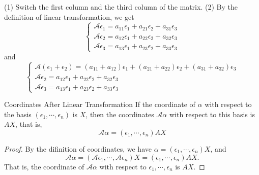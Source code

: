 \begin{solution}
  (1) Switch the first column and the third column of the matrix.
  (2) By the definition of linear transformation, we get
  \begin{equation}
    \begin{cases}
      \mathcal{A}\epsilon_1 = a_{11}\epsilon_1 + a_{21}\epsilon_2 + a_{31}\epsilon_3 \\
      \mathcal{A}\epsilon_2 = a_{12}\epsilon_1 + a_{22}\epsilon_2 + a_{32}\epsilon_3 \\
      \mathcal{A}\epsilon_3 = a_{13}\epsilon_1 + a_{23}\epsilon_2 + a_{33}\epsilon_3
    \end{cases}
  \end{equation}
  and
  \begin{equation}
    \begin{cases}
      \mathcal{A}(\epsilon_1 + \epsilon_2)= (a_{11} + a_{12})\epsilon_1 + (a_{21} + a_{22})\epsilon_2 + (a_{31} + a_{32})\epsilon_3 \\
      \mathcal{A}\epsilon_2 = a_{12}\epsilon_1 + a_{22}\epsilon_2 + a_{32}\epsilon_3 \\
      \mathcal{A}\epsilon_3 = a_{13}\epsilon_1 + a_{23}\epsilon_2 + a_{33}\epsilon_3
    \end{cases}
  \end{equation}
\end{solution}

\begin{proposition}{Coordinates After Linear Transformation}{}
  If the coordinate of $\alpha$ with respect to the basis
  $(\epsilon_1,\cdots,\epsilon_n)$ is $X$,
  then the coordinates $\mathcal{A}\alpha$ with respect to this basis is $AX$,
  that is,
  \begin{equation}
    \mathcal{A}\alpha = (\epsilon_1,\cdots,\epsilon_n)AX
  \end{equation}
\end{proposition}

\begin{proof}
  By the difinition of coordinates, we have $\alpha =
  (\epsilon_1,\cdots,\epsilon_n)X$,
  and
  \begin{equation}
    \mathcal{A}\alpha = (\mathcal{A}\epsilon_1,\cdots,\mathcal{A}\epsilon_n)X = (\epsilon_1,\cdots,\epsilon_n)AX.
  \end{equation}
  That is, the coordinate of $\mathcal{A}\alpha$ with respect to
  $\epsilon_1,\cdots,\epsilon_n$ is $AX$.
\end{proof}

